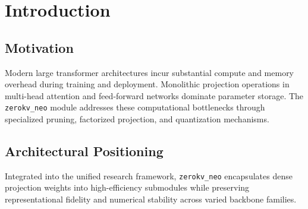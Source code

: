 \section{Introduction}

\subsection{Motivation}
Modern large transformer architectures incur substantial compute and memory overhead during training and deployment. Monolithic projection operations in multi-head attention and feed-forward networks dominate parameter storage. The \texttt{zerokv_neo} module addresses these computational bottlenecks through specialized pruning, factorized projection, and quantization mechanisms.

\subsection{Architectural Positioning}
Integrated into the unified research framework, \texttt{zerokv_neo} encapsulates dense projection weights into high-efficiency submodules while preserving representational fidelity and numerical stability across varied backbone families.
